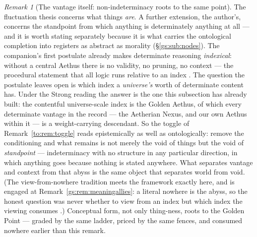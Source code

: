 \documentclass[11pt]{article}
\numberwithin{equation}{section}
\theoremstyle{plain}
\theoremstyle{definition}
\theoremstyle{remark}
\newtheorem{remark}[theorem]{Remark}
\begin{document}
\begin{remark}[The vantage itself: non-indeterminacy roots to the same
point]\label{to:rem:vantage}
The fluctuation thesis concerns what things \emph{are}. A further
extension, the author's, concerns the standpoint from which anything is
determinately anything at all --- and it is worth stating separately
because it is what carries the ontological completion into registers as
abstract as morality (\S\ref{gs:sub:nodes}). The companion's first
postulate already makes determinate reasoning \emph{indexical}: without
a central Aethus there is no validity, no pruning, no context --- the
procedural statement that all logic runs relative to an index
\cite{Aethus}. The question the postulate leaves open is which index a
\emph{universe's} worth of determinate content has. Under the Strong
reading the answer is the one this subsection has already built: the
contentful universe-scale index is the Golden Aethus, of which every
determinate vantage in the record --- the Aetherian Nexus, and our own
Aethus within it --- is a weight-carrying descendant. So the toggle of
Remark~\ref{to:rem:toggle} reads epistemically as well as
ontologically: remove the conditioning and what remains is not merely
the void of things but the void of \emph{standpoint} --- indeterminacy
with no structure in any particular direction, in which anything goes
because nothing is stated anywhere. What separates vantage and context
from that abyss is the same object that separates world from void. (The
view-from-nowhere tradition meets the framework exactly here, and is
engaged at Remark~\ref{gs:rem:meaningallies}: a literal nowhere is
the abyss, so the honest question was never whether to view from an
index but which index the viewing consumes \cite{Nagel71}.)
Conceptual form, not only thing-ness, roots to the Golden Point ---
graded by the same ladder, priced by the same fences, and consumed
nowhere earlier than this remark.
\end{remark}
\end{document}
